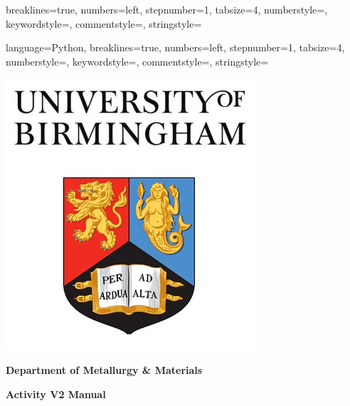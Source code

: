\documentclass[12pt,twoside]{manual}
\begin{document}










{
  breaklines=true,
  numbers=left,
  stepnumber=1,
  tabsize=4,
  numberstyle=\tiny\color{gray},
  keywordstyle=\color{blue},
  commentstyle=\color{dkgreen},
  stringstyle=\color{mauve}
}

{
	language=Python,
  breaklines=true,
  numbers=left,
  stepnumber=1,
  tabsize=4,
  numberstyle=\tiny\color{gray},
  keywordstyle=\color{blue},
  commentstyle=\color{dkgreen},
  stringstyle=\color{mauve}
}



\begin{titlepage}
  \begin{center}
    \centerline{\includegraphics[width=0.7\textwidth]{img/coverart}}


    \textbf{Department of Metallurgy \& Materials}

    \vspace*{2.0cm}
    \Large{}
    \textbf{Activity V2 Manual}
    \vspace{0.8cm}
    \normalsize{}

  \end{center}
\end{titlepage}
\end{document}
